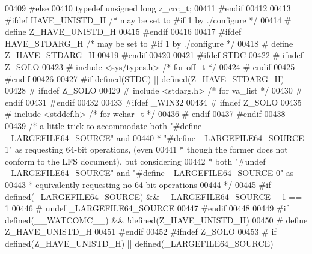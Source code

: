 \begin{DoxyCode}
00409 \textcolor{preprocessor}{#else}
00410    \textcolor{keyword}{typedef} \textcolor{keywordtype}{unsigned} \textcolor{keywordtype}{long} z\_crc\_t;
00411 \textcolor{preprocessor}{#endif}
00412 
00413 \textcolor{preprocessor}{#ifdef HAVE\_UNISTD\_H    }\textcolor{comment}{/* may be set to #if 1 by ./configure */}\textcolor{preprocessor}{}
00414 \textcolor{preprocessor}{#  define Z\_HAVE\_UNISTD\_H}
00415 \textcolor{preprocessor}{#endif}
00416 
00417 \textcolor{preprocessor}{#ifdef HAVE\_STDARG\_H    }\textcolor{comment}{/* may be set to #if 1 by ./configure */}\textcolor{preprocessor}{}
00418 \textcolor{preprocessor}{#  define Z\_HAVE\_STDARG\_H}
00419 \textcolor{preprocessor}{#endif}
00420 
00421 \textcolor{preprocessor}{#ifdef STDC}
00422 \textcolor{preprocessor}{#  ifndef Z\_SOLO}
00423 \textcolor{preprocessor}{#    include <sys/types.h>}      \textcolor{comment}{/* for off\_t */}
00424 \textcolor{preprocessor}{#  endif}
00425 \textcolor{preprocessor}{#endif}
00426 
00427 \textcolor{preprocessor}{#if defined(STDC) || defined(Z\_HAVE\_STDARG\_H)}
00428 \textcolor{preprocessor}{#  ifndef Z\_SOLO}
00429 \textcolor{preprocessor}{#    include <stdarg.h>}         \textcolor{comment}{/* for va\_list */}
00430 \textcolor{preprocessor}{#  endif}
00431 \textcolor{preprocessor}{#endif}
00432 
00433 \textcolor{preprocessor}{#ifdef \_WIN32}
00434 \textcolor{preprocessor}{#  ifndef Z\_SOLO}
00435 \textcolor{preprocessor}{#    include <stddef.h>}         \textcolor{comment}{/* for wchar\_t */}
00436 \textcolor{preprocessor}{#  endif}
00437 \textcolor{preprocessor}{#endif}
00438 
00439 \textcolor{comment}{/* a little trick to accommodate both "#define \_LARGEFILE64\_SOURCE" and}
00440 \textcolor{comment}{ * "#define \_LARGEFILE64\_SOURCE 1" as requesting 64-bit operations, (even}
00441 \textcolor{comment}{ * though the former does not conform to the LFS document), but considering}
00442 \textcolor{comment}{ * both "#undef \_LARGEFILE64\_SOURCE" and "#define \_LARGEFILE64\_SOURCE 0" as}
00443 \textcolor{comment}{ * equivalently requesting no 64-bit operations}
00444 \textcolor{comment}{ */}
00445 \textcolor{preprocessor}{#if defined(\_LARGEFILE64\_SOURCE) && -\_LARGEFILE64\_SOURCE - -1 == 1}
00446 \textcolor{preprocessor}{#  undef \_LARGEFILE64\_SOURCE}
00447 \textcolor{preprocessor}{#endif}
00448 
00449 \textcolor{preprocessor}{#if defined(\_\_WATCOMC\_\_) && !defined(Z\_HAVE\_UNISTD\_H)}
00450 \textcolor{preprocessor}{#  define Z\_HAVE\_UNISTD\_H}
00451 \textcolor{preprocessor}{#endif}
00452 \textcolor{preprocessor}{#ifndef Z\_SOLO}
00453 \textcolor{preprocessor}{#  if defined(Z\_HAVE\_UNISTD\_H) || defined(\_LARGEFILE64\_SOURCE)}

\end{DoxyCode}
